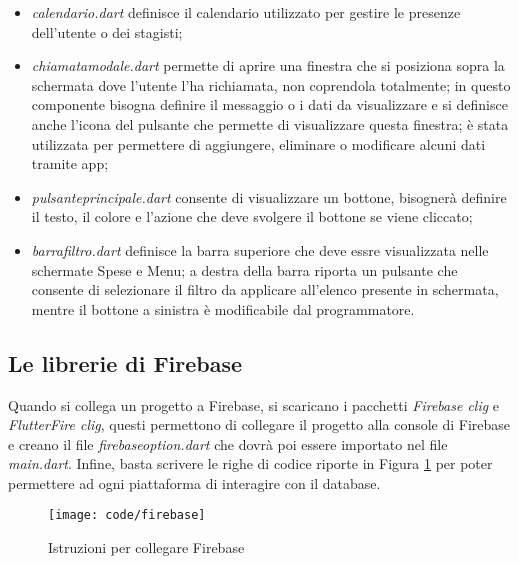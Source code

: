 \begin{itemize}
    \item \emph{calendario.dart} definisce il calendario utilizzato per gestire le presenze dell'utente o dei stagisti;
    \item \emph{chiamata\textunderscore modale.dart} permette di aprire una finestra che si posiziona sopra la schermata dove l'utente l'ha richiamata, non coprendola totalmente; in questo componente bisogna definire il messaggio o i dati da visualizzare e si definisce anche l'icona del pulsante che permette di visualizzare questa finestra; è stata utilizzata per permettere di aggiungere, eliminare o modificare alcuni dati tramite app;
    \item \emph{pulsante\textunderscore principale.dart} consente di visualizzare un bottone, bisognerà definire il testo, il colore e l'azione che deve svolgere il bottone se viene cliccato;
    \item \emph{barra\textunderscore filtro.dart} definisce la barra superiore che deve essre visualizzata nelle schermate Spese e Menu; a destra della barra riporta un pulsante che consente di selezionare il filtro da applicare all'elenco presente in schermata, mentre il bottone a sinistra è modificabile dal programmatore.
\end{itemize}

\newpage

\subsection{Le librerie di Firebase}

Quando si collega un progetto a Firebase, si scaricano i pacchetti \emph{Firebase \gls{clig}} e \emph{FlutterFire \gls{clig}}, questi permettono di collegare il progetto alla console di Firebase e creano il file \emph{firebase\textunderscore option.dart} che dovrà poi essere importato nel file \emph{main.dart}.\newline
Infine, basta scrivere le righe di codice riporte in Figura \ref{fig:code-firebase} per poter permettere ad ogni piattaforma di interagire con il database.
\begin{figure}[!h] 
    \centering 
    \texttt{[image: code/firebase]} 
    \caption{Istruzioni per collegare Firebase}
    \label{fig:code-firebase}
\end{figure}

